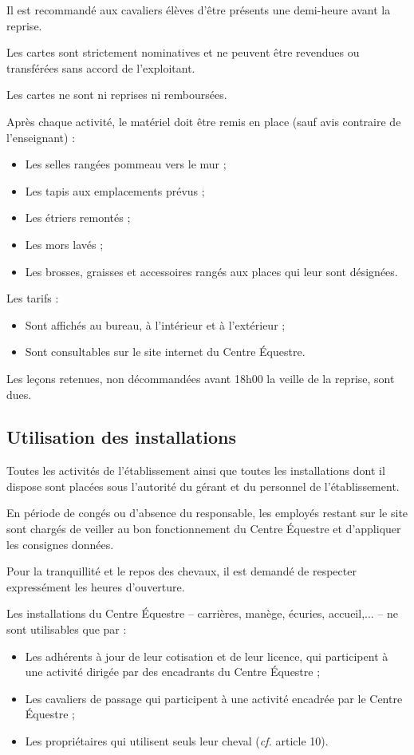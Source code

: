 \documentclass[11pt,a4paper]{article}
\begin{document}
Il est recommandé aux cavaliers élèves d'être présents une demi-heure avant la reprise.

Les cartes sont strictement nominatives et ne peuvent être revendues ou transférées sans accord de l'exploitant. \par
Les cartes ne sont ni reprises ni remboursées.

Après chaque activité, le matériel doit être remis en place (sauf avis contraire de l'enseignant) :
\begin{itemize}[leftmargin=50pt]
	\item
	Les selles rangées pommeau vers le mur ;
	\item
	Les tapis aux emplacements prévus ;
	\item
	Les étriers remontés ;
	\item
	Les mors lavés ;
	\item
	Les brosses, graisses et accessoires rangés aux places qui leur sont désignées.
\end{itemize}

Les tarifs :
\begin{itemize}[leftmargin=50pt]
\item
Sont affichés au bureau, à l'intérieur et à l'extérieur ;
\item
Sont consultables sur le site internet du Centre Équestre.
\end{itemize}

Les leçons retenues, non décommandées avant 18h00 la veille de la reprise, sont dues.

\subsection{Utilisation des installations}
Toutes les activités de l'établissement ainsi que toutes les installations dont il dispose sont placées sous l'autorité du gérant et du personnel de l'établissement. \par
En période de congés ou d'absence du responsable, les employés restant sur le site sont chargés de veiller au bon fonctionnement du Centre Équestre et d'appliquer les consignes données. \par
Pour la tranquillité et le repos des chevaux, il est demandé de respecter expressément les heures d'ouverture.

Les installations du Centre Équestre -- carrières, manège, écuries, accueil,... -- ne sont utilisables que par :
\begin{itemize}[leftmargin=50pt]
\item
Les adhérents à jour de leur cotisation et de leur licence, qui participent à une activité dirigée par des encadrants du Centre Équestre ;
\item
Les cavaliers \og de passage \fg{} qui participent à une activité encadrée par le Centre Équestre ;
\item
Les propriétaires qui utilisent seuls leur cheval (\textit{cf.} article 10).
\end{itemize}
\end{document}
